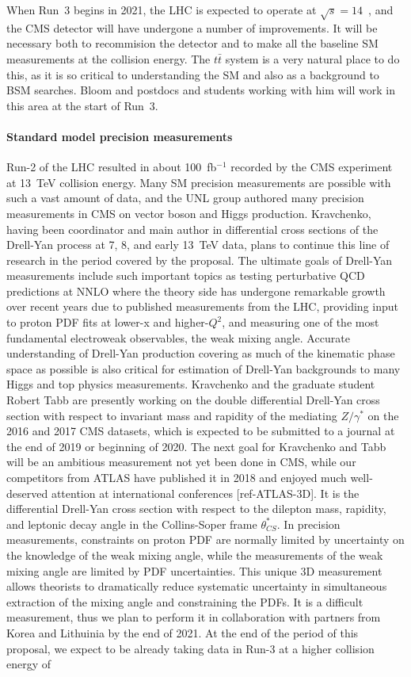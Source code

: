 When Run~3 begins in 2021, the LHC is expected to operate at $\sqrt{s} = 14$~\TeV, and the CMS detector will have undergone a number of improvements.  It will be necessary both to recommision the detector and to make all the baseline SM measurements at the collision energy.  The $t\bar{t}$ system is a very natural place to do this, as it is so critical to understanding the SM and also as a background to BSM searches.  Bloom and postdocs and students working with him will work in this area at the start of Run~3.

\paragraph{Standard model precision measurements}
Run-2 of the LHC resulted in about 100~fb$^{-1}$ recorded by the CMS experiment at 13~TeV collision energy. Many SM precision measurements are possible with such a vast amount of data, and the UNL group authored many precision measurements in CMS on vector boson and Higgs production. Kravchenko, having been coordinator and main author in differential cross sections of the Drell-Yan process at 7, 8, and early 13~TeV data, plans to continue this line of research in the period covered by the proposal. The ultimate goals of Drell-Yan measurements include such important topics as testing perturbative QCD predictions at NNLO where the theory side has undergone remarkable growth over recent years due to published measurements from the LHC, providing input to proton PDF fits at lower-x and higher-$Q^2$, and measuring one of the most fundamental electroweak observables, the weak mixing angle. Accurate understanding of Drell-Yan production covering as much of the kinematic phase space as possible is also critical for estimation of Drell-Yan backgrounds to many Higgs and top physics measurements. Kravchenko and the graduate student Robert Tabb are presently working on the double differential Drell-Yan cross section with respect to invariant mass and rapidity of the mediating $Z/\gamma^*$ on the 2016 and 2017 CMS datasets, which is expected to be submitted to a journal at the end of 2019 or beginning of 2020. The next goal for Kravchenko and Tabb will be an ambitious measurement not yet been done in CMS, while our competitors from ATLAS have published it in 2018 and enjoyed much well-deserved attention at international conferences [ref-ATLAS-3D]. It is the differential Drell-Yan cross section with respect to the dilepton mass, rapidity, and leptonic decay angle in the Collins-Soper frame $\theta^*_{CS}$. In precision measurements, constraints on proton PDF are normally limited by uncertainty on the knowledge of the weak mixing angle, while the measurements of the weak mixing angle are limited by PDF uncertainties. This unique 3D measurement allows theorists to dramatically reduce systematic uncertainty in simultaneous extraction of the mixing angle and constraining the PDFs. It is a difficult measurement, thus we plan to perform it in collaboration with partners from Korea and Lithuinia by the end of 2021. At the end of the period of this proposal, we expect to be already taking data in Run-3 at a higher collision energy of 